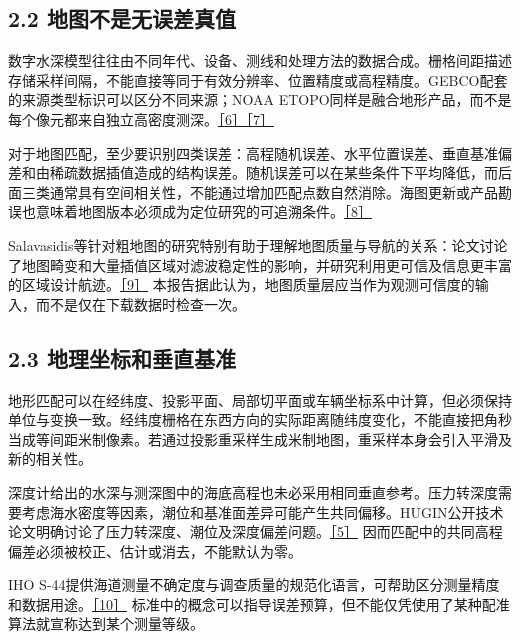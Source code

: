 \hypertarget{ux5730ux56feux4e0dux662fux65e0ux8befux5deeux771fux503c}{%
\subsection{2.2 地图不是无误差真值}\label{ux5730ux56feux4e0dux662fux65e0ux8befux5deeux771fux503c}}

数字水深模型往往由不同年代、设备、测线和处理方法的数据合成。栅格间距描述存储采样间隔，不能直接等同于有效分辨率、位置精度或高程精度。GEBCO配套的来源类型标识可以区分不同来源；NOAA ETOPO同样是融合地形产品，而不是每个像元都来自独立高密度测深。\href{https://www.gebco.net/data_and_products/gridded_bathymetry_data/}{［6］}\href{https://www.ncei.noaa.gov/products/etopo-global-relief-model}{［7］}

对于地图匹配，至少要识别四类误差：高程随机误差、水平位置误差、垂直基准偏差和由稀疏数据插值造成的结构误差。随机误差可以在某些条件下平均降低，而后面三类通常具有空间相关性，不能通过增加匹配点数自然消除。海图更新或产品勘误也意味着地图版本必须成为定位研究的可追溯条件。\href{https://www.gebco.net/data-products/gridded-bathymetry-data/data-set-errata}{［8］}

Salavasidis等针对粗地图的研究特别有助于理解地图质量与导航的关系：论文讨论了地图畸变和大量插值区域对滤波稳定性的影响，并研究利用更可信及信息更丰富的区域设计航迹。\href{https://eprints.soton.ac.uk/480480/1/joe.pdf}{［9］} 本报告据此认为，地图质量层应当作为观测可信度的输入，而不是仅在下载数据时检查一次。

\hypertarget{ux5730ux7406ux5750ux6807ux548cux5782ux76f4ux57faux51c6}{%
\subsection{2.3 地理坐标和垂直基准}\label{ux5730ux7406ux5750ux6807ux548cux5782ux76f4ux57faux51c6}}

地形匹配可以在经纬度、投影平面、局部切平面或车辆坐标系中计算，但必须保持单位与变换一致。经纬度栅格在东西方向的实际距离随纬度变化，不能直接把角秒当成等间距米制像素。若通过投影重采样生成米制地图，重采样本身会引入平滑及新的相关性。

深度计给出的水深与测深图中的海底高程也未必采用相同垂直参考。压力转深度需要考虑海水密度等因素，潮位和基准面差异可能产生共同偏移。HUGIN公开技术论文明确讨论了压力转深度、潮位及深度偏差问题。\href{https://www.navlab.net/Publications/The_HUGIN_AUV_Terrain_Navigation_Module.pdf}{［5］} 因而匹配中的共同高程偏差必须被校正、估计或消去，不能默认为零。

IHO S-44提供海道测量不确定度与调查质量的规范化语言，可帮助区分测量精度和数据用途。\href{https://iho.int/uploads/user/pubs/standards/s-44/S-44_Edition_6.2.0_adopted.pdf}{［10］} 标准中的概念可以指导误差预算，但不能仅凭使用了某种配准算法就宣称达到某个测量等级。

